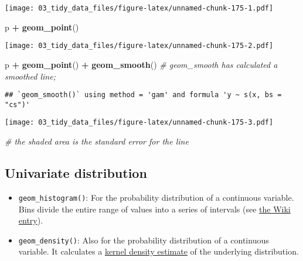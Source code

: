 \documentclass[
]{book}
\newenvironment{Shaded}{\begin{snugshade}}{\end{snugshade}}
\newcommand{\CommentTok}[1]{\textcolor[rgb]{0.56,0.35,0.01}{\textit{#1}}}
\newcommand{\KeywordTok}[1]{\textcolor[rgb]{0.13,0.29,0.53}{\textbf{#1}}}
\newcommand{\NormalTok}[1]{#1}
\newcommand{\OperatorTok}[1]{\textcolor[rgb]{0.81,0.36,0.00}{\textbf{#1}}}
\newcommand{\StringTok}[1]{\textcolor[rgb]{0.31,0.60,0.02}{#1}}
\providecommand{\tightlist}{%
  \setlength{\itemsep}{0pt}\setlength{\parskip}{0pt}}
\begin{document}
\texttt{[image: 03\_tidy\_data\_files/figure-latex/unnamed-chunk-175-1.pdf]}

\begin{Shaded}
\begin{Highlighting}[]
\NormalTok{p }\OperatorTok{+}\StringTok{ }\KeywordTok{geom\_point}\NormalTok{()}
\end{Highlighting}
\end{Shaded}

\texttt{[image: 03\_tidy\_data\_files/figure-latex/unnamed-chunk-175-2.pdf]}

\begin{Shaded}
\begin{Highlighting}[]
\NormalTok{p }\OperatorTok{+}\StringTok{ }\KeywordTok{geom\_point}\NormalTok{() }\OperatorTok{+}\StringTok{ }\KeywordTok{geom\_smooth}\NormalTok{() }\CommentTok{\# geom\_smooth has calculated a smoothed line;}
\end{Highlighting}
\end{Shaded}

\begin{verbatim}
## `geom_smooth()` using method = 'gam' and formula 'y ~ s(x, bs = "cs")'
\end{verbatim}

\texttt{[image: 03\_tidy\_data\_files/figure-latex/unnamed-chunk-175-3.pdf]}

\begin{Shaded}
\begin{Highlighting}[]
\CommentTok{\# the shaded area is the standard error for the line}
\end{Highlighting}
\end{Shaded}

\hypertarget{univariate-distribution}{%
\subsection{Univariate distribution}\label{univariate-distribution}}

\begin{itemize}
\tightlist
\item
  \texttt{geom\_histogram()}: For the probability distribution of a continuous variable. Bins divide the entire range of values into a series of intervals (see \href{https://en.wikipedia.org/wiki/Histogram}{the Wiki entry}).
\item
  \texttt{geom\_density()}: Also for the probability distribution of a continuous variable. It calculates a \href{https://en.wikipedia.org/wiki/Kernel_density_estimation}{kernel density estimate} of the underlying distribution.
\end{itemize}
\end{document}
